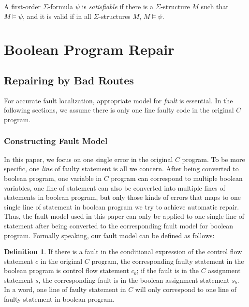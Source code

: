 \documentclass[10pt,journal,final,]{article}
\theoremstyle{definition}
\newtheorem{definition}{Definition}[section]
\begin{document}
A first-order $\Sigma$-formula $\psi$ is {\it satisfiable} if there is a $\Sigma$-structure $M$ such that $M \models\psi$, and it is valid if in all $\Sigma$-structures $M$, $M \models\psi$.

\newpage
\section{Boolean Program Repair}
\label{section:BooleanProgramRepair}
\subsection{Repairing by Bad Routes}
For accurate fault localization, appropriate model for {\it fault} is essential. In the following sections, we assume there is only one line faulty code in the original $C$ program.
\subsubsection{Constructing Fault Model}
In this paper, we focus on one single error in the original $C$ program. To be more specific, one {\it line} of faulty statement is all we concern.
After being converted to boolean program, one variable in $C$ program can correspond to multiple boolean variables, one line of statement can also be converted into multiple lines of statements in boolean program,
but only those kinds of errors that maps to one single line of statement in boolean program we try to achieve automatic repair.
Thus, the fault model used in this paper can only be applied to one single line of statement after being converted to the corresponding fault model for boolean program.
Formally speaking, our fault model can be defined as follows:
\begin{definition}
If there is a fault in the conditional expression of the control flow statement $c$ in the original $C$ program, the corresponding faulty statement in the boolean program is control flow statement $c_{b}$;
if the fault is in the $C$ assignment statement $s$, the corresponding fault is in the boolean assignment statement $s_{b}$.
In a word, one line of faulty statement in $C$ will only correspond to one line of faulty statement in boolean program.
\end{definition}
\end{document}

